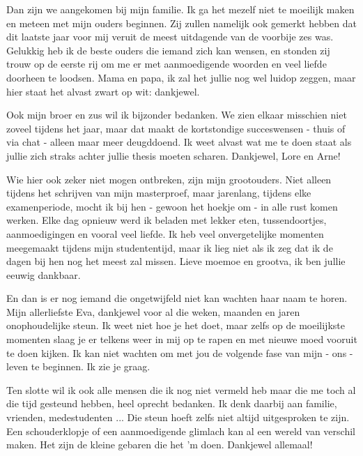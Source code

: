 Dan zijn we aangekomen bij mijn familie. Ik ga het mezelf niet te moeilijk maken en meteen met mijn ouders beginnen. Zij zullen namelijk ook gemerkt hebben dat dit laatste jaar voor mij veruit de meest uitdagende van de voorbije zes was. Gelukkig heb ik de beste ouders die iemand zich kan wensen, en stonden zij trouw op de eerste rij om me er met aanmoedigende woorden en veel liefde doorheen te loodsen. Mama en papa, ik zal het jullie nog wel luidop zeggen, maar hier staat het alvast zwart op wit: dankjewel.

Ook mijn broer en zus wil ik bijzonder bedanken. We zien elkaar misschien niet zoveel tijdens het jaar, maar dat maakt de kortstondige succeswensen - thuis of via chat - alleen maar meer deugddoend. Ik weet alvast wat me te doen staat als jullie zich straks achter jullie thesis moeten scharen. Dankjewel, Lore en Arne!

Wie hier ook zeker niet mogen ontbreken, zijn mijn grootouders. Niet alleen tijdens het schrijven van mijn masterproef, maar jarenlang, tijdens elke examenperiode, mocht ik bij hen - gewoon het hoekje om - in alle rust komen werken. Elke dag opnieuw werd ik beladen met lekker eten, tussendoortjes, aanmoedigingen en vooral veel liefde. Ik heb veel onvergetelijke momenten meegemaakt tijdens mijn studententijd, maar ik lieg niet als ik zeg dat ik de dagen bij hen nog het meest zal missen. Lieve moemoe en grootva, ik ben jullie eeuwig dankbaar.

En dan is er nog iemand die ongetwijfeld niet kan wachten haar naam te horen. Mijn allerliefste Eva, dankjewel voor al die weken, maanden en jaren onophoudelijke steun. Ik weet niet hoe je het doet, maar zelfs op de moeilijkste momenten slaag je er telkens weer in mij op te rapen en met nieuwe moed vooruit te doen kijken. Ik kan niet wachten om met jou de volgende fase van mijn - ons - leven te beginnen. Ik zie je graag.

Ten slotte wil ik ook alle mensen die ik nog niet vermeld heb maar die me toch al die tijd gesteund hebben, heel oprecht bedanken. Ik denk daarbij aan familie, vrienden, medestudenten ... Die steun hoeft zelfs niet altijd uitgesproken te zijn. Een schouderklopje of een aanmoedigende glimlach kan al een wereld van verschil maken. Het zijn de kleine gebaren die het 'm doen. Dankjewel allemaal!